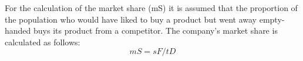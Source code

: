 For the calculation of the market share (mS) it is assumed that the proportion of the population who would have liked to buy a product but went away empty-handed buys its product from a competitor. The company's market share is calculated as follows: 
\begin{equation}
mS = sF / tD   
\end{equation}

